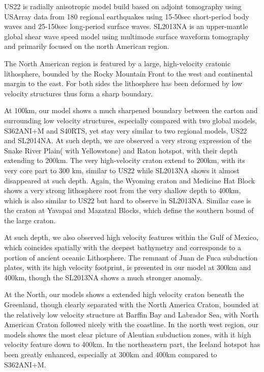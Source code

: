 \documentclass[extra,mreferee]{gji}
\begin{document}
US22 is radially anisotropic model build based on adjoint tomography using
USArray data from 180 regional earthquakes using 15-50sec short-period
body waves and 25-150sec long-period surface waves.
SL2013NA is an upper-mantle global shear wave speed model using multimode
surface waveform tomography and primarily focused on the north American
region.

The North American region is featured by a large, high-velocity cratonic
lithosphere, bounded by the Rocky Mountain Front to the west and continental
margin to the east. For both sides the lithosphere has been deformed by
low velocity structures thus form a sharp boundary.

At 100km, our model shows a much sharpened boundary between the carton
and surrounding low velocity structures, especially compared with
two global models, S362ANI+M and S40RTS, yet stay very similar to
two regional models, US22 and SL2014NA. At such depth,
we are observed a very strong expression of the Snake River Plain(
with Yellowstone) and Raton hotspot, with their depth extending to 200km.
The very high-velocity craton extend to 200km, with its very core part to
300 km, similar to US22 while SL2013NA shows it almost disappeared at such depth.
Again, the Wyoming craton and Medicine Hat Block shows a very strong lithosphere
root from the very shallow depth to 400km, which is also similar to US22 but
hard to observe in SL2013NA. Similar case is the craton at Yavapai and
Mazatzal Blocks, which define the southern bound of the large craton.

At such depth, we also observed high velocity
features within the Gulf of Mexico, which coincides spatially with the deepest
bathymetry and corresponds to a portion of ancient oceanic
Lithosphere\citep{muller2008}. The remnant of Juan de Fuca subduction
plates, with its high velocity footprint, is presented in our model at
300km and 400km, though the SL2013NA shows a much stronger anomaly.

At the North, our models shows a extended high velocity craton beneath the 
Greenland, though clearly separated with the North America Craton,
bounded at the relatively low velocity structure at Barffin Bay and Labrador
Sea, with North American Craton followed nicely with the coastline. In the
north west region, our models shows the most clear picture of
Aleutian subduction zones, with it high velocity feature down to 400km.
In the northeastern part, the Iceland hotspot has been greatly enhanced,
especially at 300km and 400km compared to S362ANI+M.
\end{document}
